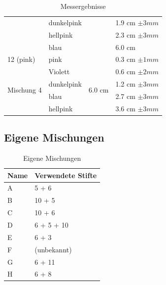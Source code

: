 \documentclass[11pt,paper=a4,final]{scrartcl}
\begin{document}
\begin{savenotes}
\begin{table}[ht!]
\begin{tabular}{|l|l|l|l|}
      			& dunkelpink	&				& 1.9 cm \(\pm 3 mm \)	\\
      			& hellpink	&				& 2.3 cm \(\pm 3 mm \)	\\
      			& blau		&				& 6.0 cm		\\ \cline{1-2} \cline{4-4}
      12 (pink)		& pink		&				& 0.3 cm \(\pm 1 mm \)	\\ \hline
      \multirow{4}{*}{Mischung 4}
      			& Violett	& \multirow{4}{*}{6.0 cm }	& 0.6 cm \(\pm 2 mm \)	\\
      			& dunkelpink	&				& 1.2 cm \(\pm 3 mm \)	\\
			& blau		& 				& 2.7 cm \(\pm 3 mm \)	\\
      			& hellpink	& 				& 3.6 cm \(\pm 3 mm \)	\\ \hline
      	
    \end{tabular}
    \caption{Messergebnisse}
    \end{table}
\end{savenotes}

\subsection{Eigene Mischungen}
\begin{savenotes}
  \begin{table}[ht!]
    \centering
    \begin{tabular}{|l|l|}
      \hline
      \bf Name & \bf Verwendete Stifte	\\ \hline
      A & 5 + 6 			\\ \hline
      B & 10 + 5			\\ \hline
      C & 10 + 6 			\\ \hline
      D & 6 + 5 + 10			\\ \hline
      E & 6 + 3				\\ \hline
      F & (unbekannt)			\\ \hline
      G & 6 + 11			\\ \hline
      H & 6 + 8				\\ \hline
    \end{tabular}
    \caption{Eigene Mischungen}
  \end{table}
\end{savenotes}
\end{document}
